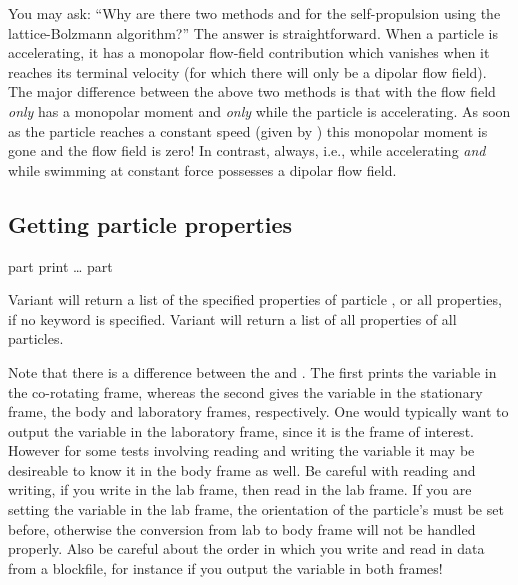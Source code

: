 \begin{arguments}
  \noindent
  You may ask: ``Why are there two methods  and
   for the self-propulsion using the lattice-Bolzmann
  algorithm?'' The answer is straightforward. When a particle is
  accelerating, it has a monopolar flow-field contribution which
  vanishes when it reaches its terminal velocity (for which there will
  only be a dipolar flow field). The major difference between the
  above two methods is that with  the flow field
  \emph{only} has a monopolar moment and \emph{only} while the
  particle is accelerating. As soon as the particle reaches a constant
  speed (given by ) this monopolar moment is gone and the
  flow field is zero! In contrast,  always, i.e., while
  accelerating \emph{and} while swimming at constant force possesses a
  dipolar flow field.

  \noindent
\end{arguments}


\subsection{Getting particle properties}
\begin{essyntax}
  part  print
  \dots
   part
\end{essyntax}

Variant  will return a list of the specified properties of
particle , or all properties, if no keyword is
specified.  Variant  will return a list of all properties
of all particles.

Note that there is a difference between the  and
.  The first prints the variable in the co-rotating
frame, whereas the second gives the variable in the stationary frame,
the body and laboratory frames, respectively. One would typically want
to output the variable in the laboratory frame, since it is the frame
of interest. However for some tests involving reading and writing the
variable it may be desireable to know it in the body frame as well. Be
careful with reading and writing, if you write in the lab frame, then
read in the lab frame. If you are setting the variable in the lab
frame, the orientation of the particle's  must be set
before, otherwise the conversion from lab to body frame will not be
handled properly.  Also be careful about the order in which you write
and read in data from a blockfile, for instance if you output the
variable in both frames!

